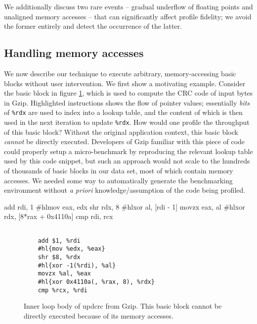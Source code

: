 We additionally discuss two rare events --
gradual underflow of floating points and unaligned memory accesses -- 
that can significantly affect profile fidelity;
we avoid the former entirely and detect the occurrence of the latter.

\subsection{Handling memory accesses}\label{sec:mapping}
We now describe our technique to execute arbitrary, memory-accessing basic blocks
without user intervention.
We first show a motivating example.
Consider the basic block in figure \ref{fig:mem-ex},
which is used to compute the CRC code of input bytes in Gzip.
Highlighted instructions shows the flow of pointer values;
essentially \textit{bits} of \verb|%rdx| are used to index into a lookup table, 
and the content of which is then used in the next iteration to 
update \verb|%rdx|.
How would one profile the throughput of this basic block?
Without the original application context,
this basic block \textit{cannot} be directly executed.
Developers of Gzip familiar with this piece of code could 
properly setup a micro-benchmark by reproducing the
relevant lookup table used by this code snippet,
but such an approach would not scale to the hundreds of 
thousands of basic blocks in our data set, most of which contain memory accesses.
We needed some way to automatically generate the benchmarking environment
without \textit{a priori} knowledge/assumption of the code being profiled.

    add rdi, 1
    #hl{mov eax, edx}
    shr rdx, 8
    #hl{xor al, [rdi - 1]}
    movzx eax, al
    #hl{xor rdx, [8*rax + 0x4110a]}
    cmp rdi, rcx
\fi
\begin{figure}[h]
\begin{Verbatim}[commandchars=\#\{\}]
    
    add $1, %rdi
    #hl{mov %edx, %eax}
    shr $8, %rdx
    #hl{xor -1(%rdi), %al}
    movzx %al, %eax
    #hl{xor 0x4110a(, %rax, 8), %rdx}
    cmp %rcx, %rdi
\end{Verbatim}
\caption{Inner loop body of updcrc from Gzip.
This basic block cannot be directly executed because
of its memory accesses.}
\label{fig:mem-ex}
\end{figure}

